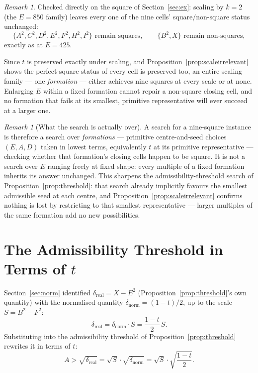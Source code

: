 \documentclass[12pt]{article}
\theoremstyle{remark}
\newtheorem{remark}[theorem]{Remark}
\begin{document}
\begin{remark}
Checked directly on the square of Section~\ref{sec:ex}: scaling by
$k = 2$ (the $E = 850$ family) leaves every one of the nine cells'
square/non-square status unchanged:
\[
\{A^2, C^2, D^2, E^2, F^2, H^2, I^2\} \text{ remain squares}, \qquad
\{B^2, X\} \text{ remain non-squares},
\]
exactly as at $E = 425$.
\end{remark}

Since $t$ is preserved exactly under scaling, and
Proposition~\ref{prop:scaleirrelevant} shows the perfect-square status
of every cell is preserved too, an entire scaling family --- one
\emph{formation} --- either achieves nine squares at every scale or at
none. Enlarging $E$ within a fixed formation cannot repair a
non-square closing cell, and no formation that fails at its smallest,
primitive representative will ever succeed at a larger one.

\begin{remark}[What the search is actually over]
A search for a nine-square instance is therefore a search over
\emph{formations} --- primitive centre-and-seed choices $(E, A, D)$
taken in lowest terms, equivalently $t$ at its primitive
representative --- checking whether that formation's closing cells
happen to be square. It is not a search over $E$ ranging freely at
fixed shape: every multiple of a fixed formation inherits its answer
unchanged. This sharpens the admissibility-threshold search of
Proposition~\ref{prop:threshold}: that search already implicitly
favours the smallest admissible seed at each centre, and
Proposition~\ref{prop:scaleirrelevant} confirms nothing is lost by
restricting to that smallest representative --- larger multiples of
the same formation add no new possibilities.
\end{remark}

\section{The Admissibility Threshold in Terms of $t$}\label{sec:thresholdt}

Section~\ref{sec:norm} identified $\delta_{\text{real}} = X - E^2$
(Proposition~\ref{prop:threshold}'s own quantity) with the normalised
quantity $\delta_{\text{norm}} = (1-t)/2$, up to the scale
$S = B^2 - F^2$:
\[
\delta_{\text{real}} = \delta_{\text{norm}}\cdot S
= \frac{1-t}{2}\,S .
\]
Substituting into the admissibility threshold of
Proposition~\ref{prop:threshold} rewrites it in terms of $t$:
\[
A > \sqrt{\delta_{\text{real}}}
= \sqrt{S}\cdot\sqrt{\delta_{\text{norm}}}
= \sqrt{S}\cdot\sqrt{\frac{1-t}{2}} .
\]
\end{document}
